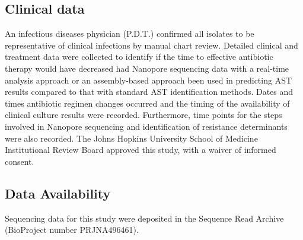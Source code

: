 \subsection{Clinical data}
\label{sec:clinical}

An infectious diseases physician (P.D.T.) confirmed all isolates to be representative of clinical infections by manual chart review. Detailed clinical and treatment data were collected to identify if the time to effective antibiotic therapy would have decreased had Nanopore sequencing data with a real-time analysis approach or an assembly-based approach been used in predicting AST results compared to that with standard AST identification methods. Dates and times antibiotic regimen changes occurred and the timing of the availability of clinical culture results were recorded. Furthermore, time points for the steps involved in Nanopore sequencing and identification of resistance determinants were also recorded. The Johns Hopkins University School of Medicine Institutional Review Board approved this study, with a waiver of informed consent.

\subsection{Data Availability}
\label{sec:avail}

Sequencing data for this study were deposited in the Sequence Read Archive (BioProject number PRJNA496461).
